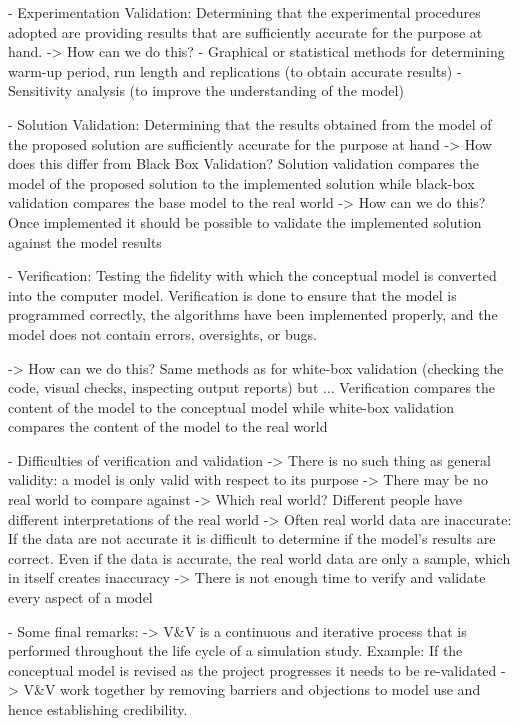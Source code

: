     - Experimentation Validation: Determining that the experimental procedures adopted are providing results that are sufficiently accurate for the purpose at hand.
    	-> How can we do this?
    		- Graphical or statistical methods for determining warm-up period, run length and replications (to obtain accurate results)
			- Sensitivity analysis (to improve the understanding of the model)
	
	- Solution Validation: Determining that the results obtained from the model of the proposed solution are sufficiently accurate for the purpose at hand
		-> How does this differ from Black Box Validation? Solution validation compares the model of the proposed solution to the implemented solution while black-box validation compares the base model to the real world
		-> How can we do this? Once implemented it should be possible to validate the implemented solution against the model results
		
	- Verification: Testing the fidelity with which the conceptual model is converted into the computer model. Verification is done to ensure that the model is programmed correctly, the algorithms have been implemented properly, and the model does not contain errors, oversights, or bugs.

		-> How can we do this? Same methods as for white-box validation (checking the code, visual checks, inspecting output reports) but ... Verification compares the content of the model to the conceptual model while white-box validation compares the content of the model to the real world
		
	- Difficulties of verification and validation
		-> There is no such thing as general validity: a model is only valid with respect to its purpose
		-> There may be no real world to compare against
		-> Which real world? Different people have different interpretations of the real world
		->  Often real world data are inaccurate: If the data are not accurate it is difficult to determine if the model's results are correct. Even if the data is accurate, the real world data are only a sample, which in itself creates inaccuracy
		-> There is not enough time to verify and validate every aspect of a model
		
	- Some final remarks:
		-> V\&V is a continuous and iterative process that is performed throughout the life cycle of a simulation study.
			Example: If the conceptual model is revised as the project progresses it needs to be re-validated
		-> V\&V work together by removing barriers and objections to model use and hence establishing credibility.
		
